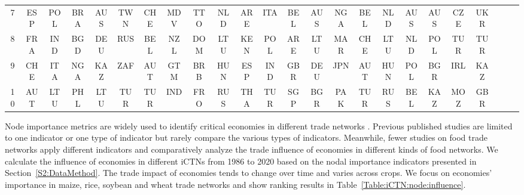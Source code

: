 \documentclass[preprint,3p,times,sort&compress]{elsarticle}
\begin{document}
\begin{table}[!ht]
\begin{tabular}{cccccccccccccccccccccccc}
        7 & ESP & POL & BRA & AUS & TWN & CHE & MDV & TTO & NLD & ARE & ITA & BEL & AUS & NGA & BEL & NLD & AUS & AUS & CZE & UKR \\ 
        8 & FRA & IND & BGD & DEU & RUS & BEL & NZL & DOM & LTU & KEN & POL & ARE & LTU & MAR & CHE & LTU & NLD & POL & TUR & TUR \\
        9 & CHE & ITA & NGA & KAZ & ZAF & AUT & GTM & BRB & HUN & ESP & IND & GBR & DEU & JPN & AUT & HUN & POL & BGR & IRL & KAZ \\  
        10 & AUT & LTU & PHL & LTU & TUR & TUR & IND & FRO & RUS & THA & TUR & SGP & BGR & PAK & TUR & RUS & BEL & KAZ & MOZ & GBR \\ 
    \bottomrule
    \end{tabular}
    \label{Table:iCTN:node:influence:ranking}
\end{table}


Node importance metrics are widely used to identify critical economies in different trade networks \cite{Ausiello-Firmani-Laura-2013-IntWirelCommun,VidalHernandez-CantoLugo-CarmonaEscalante-HuertaQuintanilla-GarzaLagler-LopezRocha-2019-OceanCoastalManage,Wei-Xie-Zhou-2022-Energy}. Previous published studies are limited to one indicator or one type of indicator but rarely compare the various types of indicators. Meanwhile, fewer studies on food trade networks apply different indicators and comparatively analyze the trade influence of economies in different kinds of food networks. We calculate the influence of economies in different iCTNs from 1986 to 2020 based on the nodal importance indicators presented in Section~\ref{S2:DataMethod}. The trade impact of economies tends to change over time and varies across crops. We focus on economies' importance in maize, rice, soybean and wheat trade networks and show ranking results in Table~\ref{Table:iCTN:node:influence}.
\end{document}
